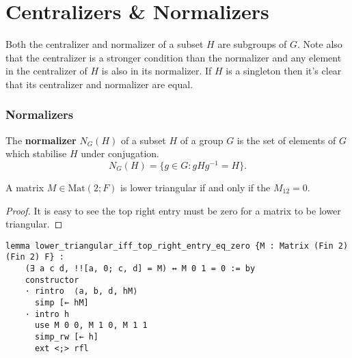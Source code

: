 \section{Centralizers \& Normalizers}

Both the centralizer and normalizer of a subset $H$ are subgroups of $G$. Note also that the centralizer is a stronger condition than the 
normalizer and any element in the centralizer of $H$ is also in its normalizer. If $H$ is a singleton then it's clear that its centralizer and normalizer are equal.\\

\subsubsection{Normalizers}

\begin{definition}
The \textbf{normalizer} $N_G(H)$ of a subset $H$ of a group $G$ is the set of elements of $G$ which stabilise $H$ under conjugation.
\begin{equation*} N_G(H) = \{ g \in G : gHg^{-1}=H\}. \end{equation*}
\end{definition}


\begin{corollary}
    \label{lower_triangular_iff_top_right_entry_eq_zero}
    \leanok
    A matrix $M \in \textrm{Mat}(2; F)$ is lower triangular if and only if the $M_{12} = 0$.
\end{corollary}
\begin{proof}
    \leanok
It is easy to see the top right entry must be zero for a matrix to be lower triangular.
\end{proof}
\begin{footnotesize}
\begin{verbatim}
lemma lower_triangular_iff_top_right_entry_eq_zero {M : Matrix (Fin 2) (Fin 2) F} :
    (∃ a c d, !![a, 0; c, d] = M) ↔ M 0 1 = 0 := by
    constructor
    · rintro  ⟨a, b, d, hM⟩
      simp [← hM]
    · intro h
      use M 0 0, M 1 0, M 1 1
      simp_rw [← h]
      ext <;> rfl
\end{verbatim}
\end{footnotesize}

